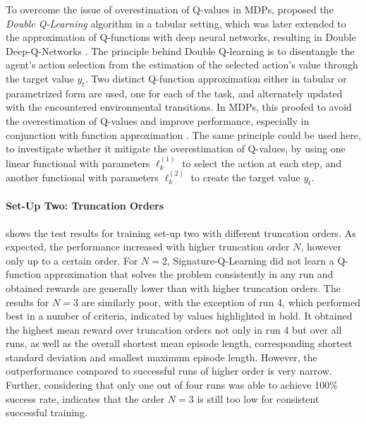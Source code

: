 \documentclass[
    a4paper,
    11pt,
    bibliography=totoc,
    listof=totoc,      
    headinclude=true,
    cleardoublepage=empty,
]{scrbook}
\theoremstyle{plain}
\theoremstyle{definition}
\theoremstyle{remark}
\begin{document}
To overcome the issue of overestimation of Q-values in MDPs,
\cite{hasselt2010_dq} proposed the \textit{Double Q-Learning} algorithm in a
tabular setting, which was later extended to the approximation of Q-functions
with deep neural networks, resulting in Double Deep-Q-Networks
\cite{hasselt2016_drlwdq}. The principle behind Double Q-learning is to
disentangle the agent's action selection from the estimation of the selected
action's value through the target value $y_t$. Two distinct Q-function
approximation either in tabular or parametrized form are used, one for each
of the task, and alternately updated with the encountered environmental
transitions. In MDPs, this proofed to avoid the overestimation of Q-values and
improve performance, especially in conjunction with function approximation
\cite{hasselt2016_drlwdq}. The same principle could be used here, to
investigate whether it mitigate the overestimation of Q-values, by using one
linear functional with parameters $\ell_k^{(1)}$ to select the action at each
step, and another functional with parameters  $\ell_k^{(2)}$ to create the
target value $y_t$.

\paragraph{Set-Up Two: Truncation Orders}
\label{chapter:Experiments:section:MountainCar:sub:Results:par:SetUpTwo}

 shows the test results for
training set-up two with different truncation orders. As expected, the
performance increased with higher truncation order $N$, however only up to a
certain order. For $N=2$, Signature-Q-Learning did not learn a Q-function
approximation that solves the problem consistently in any run and obtained
rewards are generally lower than with higher truncation orders. The results
for $N=3$ are similarly poor, with the exception of run 4, which performed
best in a number of criteria, indicated by values highlighted in bold. It
obtained the highest mean reward over truncation orders not only in run 4 but
over all runs, as well as the overall shortest mean episode length,
corresponding shortest standard deviation and smallest maximum episode length.
However, the outperformance compared to successful runs of higher order is
very narrow. Further, considering that only one out of four runs was able to
achieve 100\% success rate, indicates that the order $N=3$ is still too low
for consistent successful training.
\end{document}
